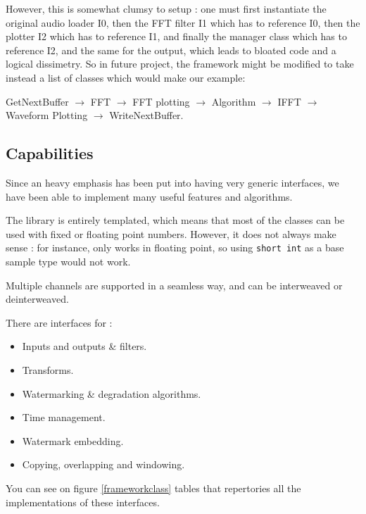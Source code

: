 However, this is somewhat clumsy to setup : one must first instantiate the original audio loader I0, then the FFT filter I1 which has to reference I0, then the plotter I2 which has to reference I1, and finally the manager class which has to reference I2, and the same for the output, which leads to bloated code and a logical dissimetry.
So in future project, the framework might be modified to take instead a list of classes which would make our example:

GetNextBuffer $\rightarrow$ FFT $\rightarrow$ FFT plotting $\rightarrow$ Algorithm $\rightarrow$ IFFT $\rightarrow$ Waveform Plotting $\rightarrow$ WriteNextBuffer.

\subsection{Capabilities}
Since an heavy emphasis has been put into having very generic interfaces, we have been able to implement many useful features and algorithms.

The library is entirely templated, which means that most of the classes can be used with fixed or floating point numbers. However, it does not always make sense : for instance,  only works in floating point, so using \texttt{short int} as a base sample type would not work.

Multiple channels are supported in a seamless way, and can be interweaved or deinterweaved.

There are interfaces for : 
\begin{itemize}
\item Inputs and outputs \& filters.
\item Transforms.
\item Watermarking \& degradation algorithms.
\item Time management.
\item Watermark embedding.
\item Copying, overlapping and windowing.
\end{itemize}

You can see on figure \ref{frameworkclass} tables that repertories all the implementations of these interfaces.

